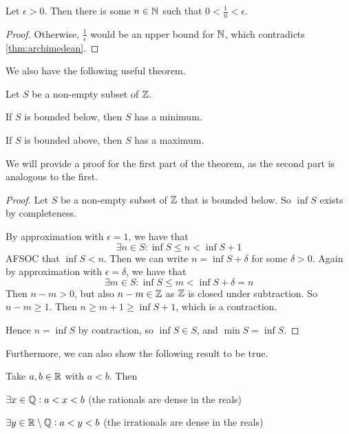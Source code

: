 \documentclass{styles/tufte}
\begin{document}
      \begin{corollary}{}{}
        Let $\epsilon > 0$. Then there is some $n \in \mathbb{N}$ such that $0 < \frac{1}{n} < \epsilon$.
      \end{corollary}
      \begin{proof}
        Otherwise, $\frac{1}{\epsilon}$ would be an upper bound for $\mathbb{N}$, which contradicts \cref{thm:archimedean}.
      \end{proof}
      
      We also have the following useful theorem.
      
      \begin{theorem}{}{}
        Let $S$ be a non-empty subset of $\mathbb{Z}$.
        \begin{romanenum}
          \item If $S$ is bounded below, then $S$ has a minimum.
          \item If $S$ is bounded above, then $S$ has a maximum.
        \end{romanenum}
      \end{theorem}
      
      We will provide a proof for the first part of the theorem, as the second part is analogous to the first.
      
      \begin{proof}
        Let $S$ be a non-empty subset of $\mathbb{Z}$ that is bounded below. So $\inf S$ exists by completeness.
        
        By approximation with $\epsilon = 1$, we have that
        \[ \exists n \in S : \inf S \leqslant n < \inf S + 1 \]
        AFSOC that $\inf S < n$. Then we can write $n = \inf S + \delta$ for some $\delta > 0$. Again by approximation with $\epsilon = \delta$, we have that
        \[ \exists m \in S : \inf S \leqslant m < \inf S + \delta = n \]
        Then $n - m > 0$, but also $n - m \in \mathbb{Z}$ as $\mathbb{Z}$ is closed under subtraction. So $n - m \geqslant 1$. Then $n \geqslant m + 1 \geqslant \inf S + 1$, which is a contraction.
        
        Hence $n = \inf S$ by contraction, so $\inf S \in S$, and $\min S = \inf S$.
      \end{proof}
      
      Furthermore, we can also show the following result to be true.
      
      \begin{proposition}{}{}
        Take $a, b \in \mathbb{R}$ with $a < b$. Then
        \begin{romanenum}
          \item $\exists x \in \mathbb{Q} : a < x < b$ \hfill (the rationals are dense in the reals)
          \item $\exists y \in \mathbb{R} \setminus \mathbb{Q} : a < y < b$ \hfill (the irrationals are dense in the reals)
        \end{romanenum}
      \end{proposition}
      
\end{document}
